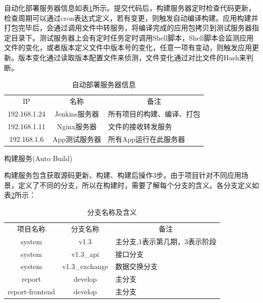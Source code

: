 \documentclass[8pt]{book}
\makeatletter
\numberwithin{dummy}{section}
\theoremstyle{ocrenumbox}
\theoremstyle{blacknumex}
\theoremstyle{blacknumbox}
\theoremstyle{ocrenum}
\renewcommand{\subsubsection}{\@startsection {subsubsection}{3}{\z@}
	{-2ex \@plus -0.1ex \@minus -.2ex}
	{.2ex \@plus.2ex }
	{\normalfont\small\sffamily\bfseries}}
\makeatother
\begin{document}
自动化部署服务器信息如表\ref{table:databaseconnectionpool}所示。提交代码后，构建服务器定时检查代码更新，检查周期可以通过cron表达式定义，若有变更，则触发自动编译构建。应用构建并打包完毕后，会通过调用文件中转服务，将编译完成的应用包拷贝到测试服务器指定目录下。测试服务器上会有定时任务定时调用Shell脚本，Shell脚本会监测应用文件的变化，或者版本定义文件中版本号的变化，任意一项有变动，则触发应用更新。版本变化通过读取版本配置文件来侦测，文件变化通过对比文件的Hash来判断。

\begin{table}[htbp]
	\caption{自动部署服务器信息}
	\label{table:databaseconnectionpool}
	\begin{center}
		\begin{tabular}{|c|c|p{5cm}|}
			\hline
			\multirow{1}{*}{IP}
			& \multicolumn{1}{c|}{名称} 
			& \multicolumn{1}{c|}{备注}\\			
			\cline{1-3}
			192.168.1.24 &  Jenkins服务器  & 所有项目的构建、编译、打包 \\
			\hline
			192.168.1.11 & Nginx服务器 & 文件的接收转发服务 \\
			\hline
			192.168.1.6 & App测试服务器 & 所有App运行在此服务器 \\
			\hline				
		\end{tabular}	
	\end{center}
\end{table}


\subsubsection{构建服务(Auto Build)}

构建服务包含获取源码更新、构建、构建后操作3步。由于项目针对不同应用场景，定义了不同的分支，所以在构建时，需要了解每个分支的含义。各分支定义如表\ref{table:projectbranch}所示：

\begin{table}[htbp]
	\caption{分支名称及含义}
	\label{table:projectbranch}
	\begin{center}
		\begin{tabular}{|c|c|p{6cm}|}
			\hline
			\multirow{1}{*}{项目名称}		 
			& \multicolumn{1}{c|}{分支名称}
			& \multicolumn{1}{c|}{备注}\\			
			\cline{1-3}
			system &  v1.3 & 主分支,1表示第几期，3表示阶段 \\
			\hline
			system & v1.3\_api & 接口分支 \\		
			\hline
			system & v1.3\_exchange & 数据交换分支 \\		
			\hline
			report & develop & 主分支 \\		
			\hline
			report-frontend & develop & 主分支 \\		
			\hline							
		\end{tabular}	
	\end{center}
\end{table}
\end{document}
